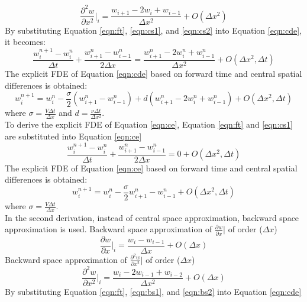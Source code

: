 \documentclass[letterpaper,12pt]{article}
\begin{document}
\begin{equation}
	\frac{\partial^2 w}{\partial x^2}\vert_{i}=\frac{w_{i+1}-2w_i+w_{i-1}}{\Delta x^2}+O(\Delta x^2)
	\label{eqn:cs2}
\end{equation}
By substituting Equation \ref{eqn:ft}, \ref{eqn:cs1}, and \ref{eqn:cs2} into Equation \ref{eqn:cde}, it becomes:
\begin{equation}
	\frac{w_{i}^{n+1}-{w_{i}^{n}}}{\Delta t}+\frac{w_{i+1}^{n}-w_{i-1}^{n}}{2\Delta x}
	=\frac{w_{i+1}^{n}-2w_{i}^{n}+w_{i-1}^{n}}{\Delta x^2}+O(\Delta x^2, \Delta t)
\end{equation}
The explicit FDE of Equation \ref{eqn:cde} based on forward time and central spatial differences is obtained:
\begin{equation}
	w_{i}^{n+1}= w_{i}^{n}-\frac{\sigma}{2}(w_{i+1}^{n}-w_{i-1}^{n})+d(w_{i+1}^{n}-2w_{i}^{n}+w_{i-1}^{n})+O(\Delta x^2,\Delta t)
	\label{eqn:FTCS}
\end{equation}
where $\sigma = \frac{V\Delta t}{\Delta x }$ and $d = \frac{\nu\Delta t}{\Delta x^2 }$.
\\To derive the explicit FDE of Equation \ref{eqn:ce}, Equation \ref{eqn:ft} and \ref{eqn:cs1} are
substituted into Equation \ref{eqn:ce}
\begin{equation}
	\frac{w_{i}^{n+1}-{w_{i}^{n}}}{\Delta t}+\frac{w_{i+1}^{n}-w_{i-1}^{n}}{2\Delta x}
	=0+O(\Delta x^2, \Delta t)
\end{equation}
The explicit FDE of Equation \ref{eqn:ce} based on forward time and central spatial differences is obtained:
\begin{equation}
	w_{i}^{n+1}= w_{i}^{n}-\frac{\sigma}{2}w_{i+1}^{n}-w_{i-1}^{n}+O(\Delta x^2, \Delta t)
\end{equation}
where $\sigma = \frac{V\Delta t}{\Delta x }$.
\\In the second derivation, instead of central space approximation, backward space approximation is used.
Backward space approximation of $\frac{\partial w}{\partial x}\vert$ of order ($\Delta x$)
\begin{equation}
	\frac{\partial w}{\partial x}\vert_{i}=\frac{w_{i}-w_{i-1}}{\Delta x}+O(\Delta x)
	\label{eqn:bs1}
\end{equation}
Backward space approximation of $\frac{\partial^2 w}{\partial x^2}\vert$ of order ($\Delta x$)
\begin{equation}
	\frac{\partial^2 w}{\partial x^2}\vert_{i}=\frac{w_{i}-2w_{i-1}+w_{i-2}}{\Delta x^2}+O(\Delta x)
	\label{eqn:bs2}
\end{equation}
By substituting Equation \ref{eqn:ft}, \ref{eqn:bs1}, and \ref{eqn:bs2} into Equation \ref{eqn:cde}
\end{document}
